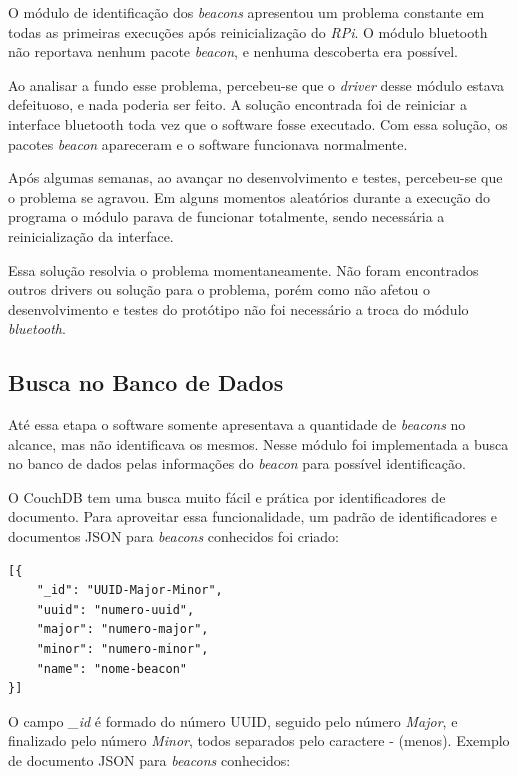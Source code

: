 O módulo de identificação dos \textit{beacons} apresentou um problema constante em todas as primeiras execuções após reinicialização do \textit{RPi}. O módulo bluetooth não reportava nenhum pacote \textit{beacon}, e nenhuma descoberta era possível. 

Ao analisar a fundo esse problema, percebeu-se que o \textit{driver} desse módulo estava defeituoso, e nada poderia ser feito. A solução encontrada foi de reiniciar a interface bluetooth toda vez que o software fosse executado. Com essa solução, os pacotes \textit{beacon} apareceram e o software funcionava normalmente.

Após algumas semanas, ao avançar no desenvolvimento e testes, percebeu-se que o problema se agravou. Em alguns momentos aleatórios durante a execução do programa o módulo parava de funcionar totalmente, sendo necessária a reinicialização da interface.

Essa solução resolvia o problema momentaneamente. Não foram encontrados outros drivers ou solução para o problema, porém como não afetou o desenvolvimento e testes do protótipo não foi necessário a troca do módulo \textit{bluetooth}.

\subsection{Busca no Banco de Dados}\label{sec:quarto-modulo}

Até essa etapa o software somente apresentava a quantidade de \textit{beacons} no alcance, mas não identificava os mesmos. Nesse módulo foi implementada a busca no banco de dados pelas informações do \textit{beacon} para possível identificação.

O CouchDB tem uma busca muito fácil e prática por identificadores de documento. Para aproveitar essa funcionalidade, um padrão de identificadores e documentos JSON para \textit{beacons} conhecidos foi criado:

\begin{verbatim}
[{
    "_id": "UUID-Major-Minor",
    "uuid": "numero-uuid",
    "major": "numero-major",
    "minor": "numero-minor",
    "name": "nome-beacon"
}]
\end{verbatim}

O campo \textit{\_id} é formado do número UUID, seguido pelo número \textit{Major}, e finalizado pelo número \textit{Minor}, todos separados pelo caractere - (menos). Exemplo de documento JSON para \textit{beacons} conhecidos:

